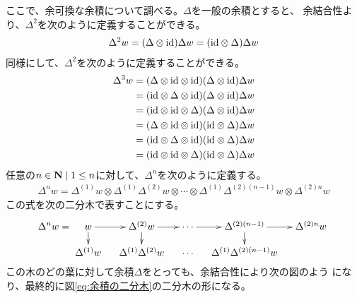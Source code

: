 	ここで、余可換な余積について調べる。$\Delta$を一般の余積とすると、
	余結合性より、$\Delta^2$を次のように定義することができる。
	\begin{equation*}\begin{split} %
		\Delta^2w=(\Delta\otimes\myid)\Delta w=(\myid\otimes\Delta)\Delta w
	\end{split}\end{equation*} %
	同様にして、$\Delta^2$を次のように定義することができる。
	\begin{equation*}\begin{split} %
		\Delta^3w
		&=(\Delta\otimes\myid\otimes\myid)(\Delta\otimes\myid)\Delta w \\
		&=(\myid\otimes\Delta\otimes\myid)(\Delta\otimes\myid)\Delta w \\
		&=(\myid\otimes\myid\otimes\Delta)(\Delta\otimes\myid)\Delta w \\
		&=(\Delta\otimes\myid\otimes\myid)(\myid\otimes\Delta)\Delta w \\
		&=(\myid\otimes\Delta\otimes\myid)(\myid\otimes\Delta)\Delta w \\
		&=(\myid\otimes\myid\otimes\Delta)(\myid\otimes\Delta)\Delta w \\
	\end{split}\end{equation*} %
	任意の$n\in{\mathbf{N}}\;\vert\; 1\le n$に対して、$\Delta^n$を次のように定義する。
	\begin{equation*}\begin{split} %
		\Delta^nw = \Delta^{(1)}w\otimes \Delta^{(1)}\Delta^{(2)}w\otimes 
		\cdots\otimes \Delta^{(1)}\Delta^{(2)(n-1)}w\otimes \Delta^{(2)n}w
	\end{split}\end{equation*} %
	この式を次の二分木で表すことにする。
	\begin{equation}\label{eq:余積の二分木}
		\Delta^nw = \xymatrix@R=1pc@C=1pc{
			w \ar[r]\ar[d] & \Delta^{(2)}w \ar[r]\ar[d] 
			& \cdots \ar[r] & \Delta^{(2)(n-1)} \ar[r]\ar[d] & \Delta^{(2)n}w \\
			\Delta^{(1)}w & \Delta^{(1)}\Delta^{(2)}w 
			& \cdots & \Delta^{(1)}\Delta^{(2)(n-1)}w \\
		}
	\end{equation}
	この木のどの葉に対して余積$\Delta$をとっても、余結合性により次の図のよう
	になり、最終的に図\eqref{eq:余積の二分木}の二分木の形になる。
